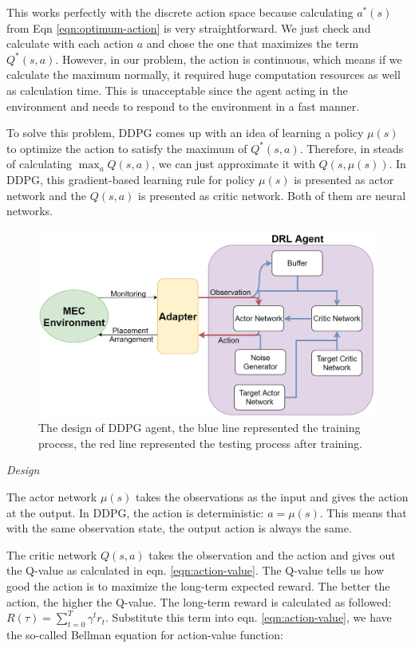 \documentclass[conference]{IEEEtran}
\begin{document}
This works perfectly with the discrete action space because calculating $a^*(s)$ from Eqn \ref{eqn:optimum-action} is very straightforward. We just check and calculate with each action $a$ and chose the one that maximizes the term $Q^*(s, a)$. However, in our problem, the action is continuous, which means if we calculate the maximum normally, it required huge computation resources as well as calculation time. This is unacceptable since the agent acting in the environment and needs to respond to the environment in a fast manner. 

To solve this problem, DDPG comes up with an idea of learning a policy $\mu(s)$ to optimize the action to satisfy the maximum of $Q^*(s, a)$. Therefore, in steads of calculating $\max_{a} Q(s,a)$, we can just approximate it with $Q(s, \mu(s))$. In DDPG, this gradient-based learning rule for policy $\mu(s)$ is presented as actor network and the $Q(s, a)$ is presented as critic network. Both of them are neural networks.

\begin{figure}[]
    \centering
    \includegraphics[scale = 0.23]{imgs/RL_design.png}
    \caption{The design of DDPG agent, the blue line represented the training process, the red line represented the testing process after training.}
    \label{fig:DDPG_design}
\end{figure}

\textit{Design}

The actor network $\mu(s)$ takes the observations as the input and gives the action at the output. In DDPG, the action is deterministic: $a = \mu(s)$. This means that with the same observation state, the output action is always the same. 

The critic network $Q(s,a)$ takes the observation and the action and gives out the Q-value as calculated in eqn. \ref{eqn:action-value}. The Q-value tells us how good the action is to maximize the long-term expected reward. The better the action, the higher the Q-value. The long-term reward is calculated as followed: $R(\tau) = \sum_{t=0}^{T} \gamma^t r_t$. Substitute this term into eqn. \ref{eqn:action-value}, we have the so-called Bellman equation for action-value function: 
\end{document}
